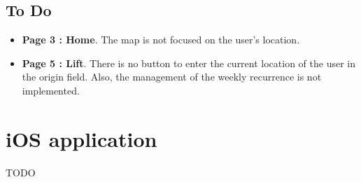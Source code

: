 \section{To Do}
\begin{itemize}
\item {\bf Page 3 : Home}. The map is not focused on the user's location.
\item {\bf Page 5 : Lift}. There is no button to enter the current location of the user in the origin field. Also, the management of the weekly recurrence is not implemented.
\end{itemize}

\chapter{iOS application}

TODO